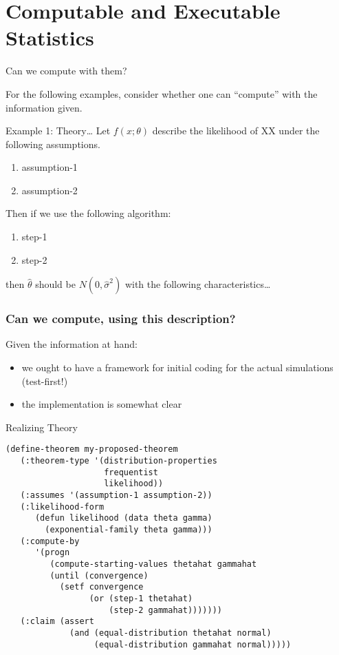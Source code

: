 \documentclass{beamer}
\begin{document}
\section{Computable and Executable Statistics}

\begin{frame}{Can we compute with them?}
  
  For the following examples, consider whether one can ``compute''
  with the information given.
\end{frame}


\begin{frame}[fragile]{Example 1: Theory\ldots}
  \label{example1}
  Let $f(x;\theta)$ describe the likelihood of XX under the following
  assumptions.  
  \begin{enumerate}
  \item assumption-1
  \item assumption-2
  \end{enumerate}
  Then if we use the following algorithm:
  \begin{enumerate}
  \item step-1
  \item step-2
  \end{enumerate}
  then $\hat{\theta}$ should be $N(0,\hat\sigma^2)$ with the following
  characteristics\ldots
\end{frame}

\begin{frame}
  \frametitle{Can we compute, using this description?}
  Given the information at hand:
  \begin{itemize}
  \item we ought to have a framework for initial coding for the
    actual simulations (test-first!)
  \item the implementation is somewhat clear
  \end{itemize}
\end{frame}

\begin{frame}[fragile]{Realizing Theory}
  \small{
\begin{verbatim}  
(define-theorem my-proposed-theorem
   (:theorem-type '(distribution-properties
                    frequentist
                    likelihood))
   (:assumes '(assumption-1 assumption-2))
   (:likelihood-form
      (defun likelihood (data theta gamma)
        (exponential-family theta gamma)))
   (:compute-by
      '(progn
         (compute-starting-values thetahat gammahat
         (until (convergence)
           (setf convergence
                 (or (step-1 thetahat)
                     (step-2 gammahat)))))))
   (:claim (assert 
             (and (equal-distribution thetahat normal)
                  (equal-distribution gammahat normal)))))
\end{verbatim}
  }
\end{frame}
\end{document}
